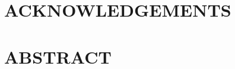 \newenvironment{preliminary}{}{}
\titleformat{\chapter}[hang]{\large\center}{\thechapter}{0 pt}{}
\titlespacing*{\chapter}{0pt}{-33 pt}{6 pt} %
\begin{preliminary}


\begin{center}
\vspace*{\fill}
\textit{\mydedication}
\vspace*{\fill}
\end{center}


\clearpage
\chapter*{ACKNOWLEDGEMENTS}

\myacknowledgements



\clearpage
\chapter*{ABSTRACT}
\begin{center}
\mytitle

\myauthor

\mysupervisorname

\end{center}

\myabstract


\clearpage
{} %
\singlespacing


\tableofcontents


\clearpage
\listoftables
{}


\end{preliminary}
